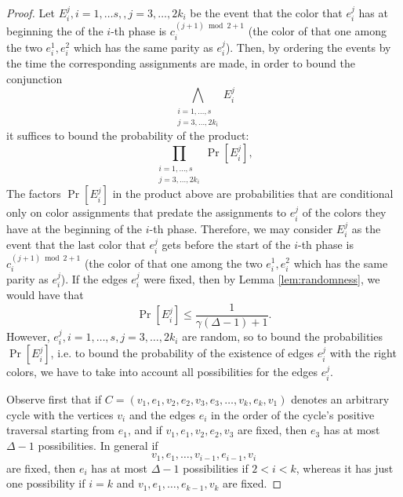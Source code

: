 \documentclass{amsart}
\theoremstyle{plain}
\begin{document}
\begin{proof}
Let $E_i^j, i=1, \ldots s, ,j=3, \ldots, 2k_i$ be the event that %
the color that $e_i^j$ has at  beginning the  of the $i$-th phase is $c_i^{(j+1) \bmod 2 +1}$ (the color of that one among the two $e_i^1, e_i^2$ which has the same parity as $e_i^j$). Then, %
by ordering the events by the time the corresponding assignments are made, in order to bound the conjunction 
$$\bigwedge_{\substack{i=1, \ldots, s\\ j=3, \ldots, 2k_i}	}E_i^j$$
it 
suffices to bound the probability of the product:
\begin{equation}\label{eq:hat}
\prod_{\substack{i=1, \ldots, s\\ j=3, \ldots, 2k_i}	}\Pr[E_i^j], \end{equation}
 The factors $ \Pr[E_i^j]$ in the product above are probabilities that are conditional only on color assignments that predate the assignments to $e_i^j$ of the colors they have at the beginning of the $i$-th phase. Therefore, we may consider $E_i^j$ as the event that the last color that $e_i^j$ gets before the start of the $i$-th phase is $c_i^{(j+1) \bmod 2 +1}$ (the color of that one among the two $e_i^1, e_i^2$ which has the same parity as $e_i^j$). If the edges $e_i^j$ were fixed, then by  Lemma \ref{lem:randomness}, we would have that $$  \Pr[E_i^j]\leq \frac{1}{\gamma(\Delta - 1)+1}. $$
  However, $e_i^j, i=1, \ldots, s, j=3, \ldots,  2k_i$ are random, so to bound  the probabilities   $\Pr[E_i^j]$,  i.e. to bound the probability of the existence of edges  $e_i^j$ with the right colors, we have to take into account all possibilities for the edges $e_i^j$. 
  
    Observe first that if $C =(v_1, e_1, v_2, e_2, v_3, e_3,  \ldots, v_k, e_k, v_1)$ 
  denotes an arbitrary  cycle with the vertices $v_i$ and the edges  $e_i$ 
  in the order of the cycle's  positive traversal starting from $e_1$, and if $v_1, e_1, v_2, e_2, v_3$ are fixed,  then $e_3$ has at most $\Delta-1$ 
  possibilities. In general  if  $$v_1, e_1, \ldots, v_{i-1},  e_{i-1}, v_i$$
  are fixed, then $e_i$ has at most $\Delta -1$ possibilities  if $2 < i < k$, whereas it    has just one possibility if $i=k$ 
  and $v_1, e_1, \ldots, e_{k-1},  v_k$ are fixed.  
  

\end{proof}
\end{document}
